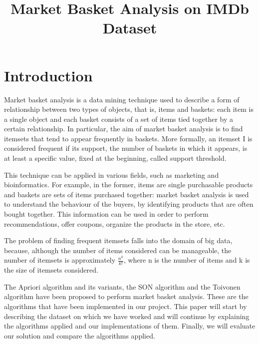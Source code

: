 \documentclass[conference,compsoc]{IEEEtran}
\theoremstyle{definition}
\begin{document}
\title{Market Basket Analysis on IMDb Dataset}

\author{
\and
{}
}

\maketitle

\thispagestyle{plain}
\pagestyle{plain}


\section{Introduction}
Market basket analysis is a data mining technique used to describe a form of relationship between two types of objects, that is, items and baskets: each item is a single object and each basket consists of a set of items tied together by a certain relationship. In particular, the aim of market basket analysis is to find itemsets that tend to appear frequently in baskets. More formally, an itemset I is considered frequent if its support, the number of baskets in which it appears, is at least a specific value, fixed at the beginning, called support threshold. 

This technique can be applied in various fields, such as marketing and bioinformatics. For example, in the former, items are single purchasable products and baskets are sets of items purchased together: market basket analysis is used to understand the behaviour of the buyers, by identifying products that are often bought together. This information can be used in order to perform recommendations, offer coupons, organize the products in the store, etc. 

The problem of finding frequent itemsets falls into the domain of big data, because, although the number of items considered can be manageable, the number of itemsets is approximately \( \frac{n^k}{k!}\), where n is the number of items and k is the size of itemsets considered. 

The Apriori algorithm and its variants, the SON algorithm and the Toivonen algorithm have been proposed to perform market basket analysis. These are the algorithms that have been implemented in our project. This paper will start by describing the dataset on which we have worked and will continue by explaining the algorithms applied and our implementations of them. Finally, we will evaluate our solution and compare the algorithms applied.
\end{document}
